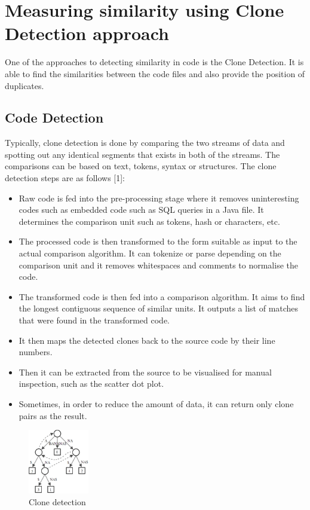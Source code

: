 \section{Measuring similarity using Clone Detection approach}
One of the approaches to detecting similarity in code is the Clone Detection. It is able to find the similarities between the code files and also provide the position of duplicates.

\subsection{Code Detection}
Typically, clone detection is done by comparing the two streams of data and spotting out any identical segments that exists in both of the streams. The comparisons can be based on text, tokens, syntax or structures.
The clone detection steps are as follows [1]:
\begin{itemize}
\item Raw code is fed into the pre-processing stage where it removes uninteresting codes such as embedded code such as SQL queries in a Java file. It determines the comparison unit such as tokens, hash or characters, etc.
\item The processed code is then transformed to the form suitable as input to the actual comparison algorithm. It can tokenize or parse depending on the comparison unit and it removes whitespaces and comments to normalise the code.
\item The transformed code is then fed into a comparison algorithm. It aims to find the longest contiguous sequence of similar units. It outputs a list of matches that were found in the transformed code.
\item It then maps the detected clones back to the source code by their line numbers.
\item Then it can be extracted from the source to be visualised for manual inspection, such as the scatter dot plot.
\item Sometimes, in order to reduce the amount of data, it can return only clone pairs as the result. 
\end{itemize}
\begin{figure} [ht]
\centering
\includegraphics{Figures/clonedetection}
\caption{Clone detection}
\label{fig:clone}
\end{figure}
